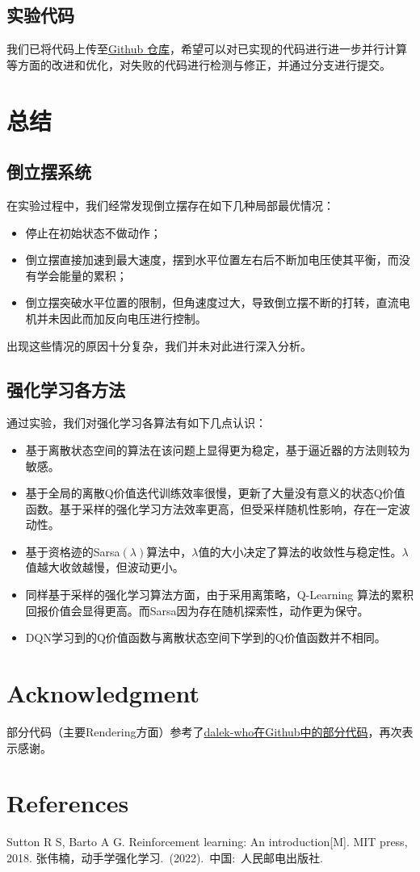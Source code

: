 \documentclass[conference,10pt]{IEEEtran}
\begin{document}
\subsection{实验代码}
我们已将代码上传至\href{https://github.com/Kingsley-Cheng/UCAS/tree/main/ReinforcementLearning/Homework1}{Github 仓库}，希望可以对已实现的代码进行进一步并行计算等方面的改进和优化，对失败的代码进行检测与修正，并通过分支进行提交。


\section{总结}
\subsection{倒立摆系统}
在实验过程中，我们经常发现倒立摆存在如下几种局部最优情况：
\begin{itemize}
\item 停止在初始状态不做动作；
\item 倒立摆直接加速到最大速度，摆到水平位置左右后不断加电压使其平衡，而没有学会能量的累积；
\item 倒立摆突破水平位置的限制，但角速度过大，导致倒立摆不断的打转，直流电机并未因此而加反向电压进行控制。
\end{itemize}
出现这些情况的原因十分复杂，我们并未对此进行深入分析。
\subsection{强化学习各方法}
通过实验，我们对强化学习各算法有如下几点认识：
\begin{itemize}
\item 基于离散状态空间的算法在该问题上显得更为稳定，基于逼近器的方法则较为敏感。
\item 基于全局的离散Q价值迭代训练效率很慢，更新了大量没有意义的状态Q价值函数。基于采样的强化学习方法效率更高，但受采样随机性影响，存在一定波动性。
\item 基于资格迹的Sarsa$(\lambda)$算法中，$\lambda$值的大小决定了算法的收敛性与稳定性。$\lambda$ 值越大收敛越慢，但波动更小。
\item 同样基于采样的强化学习算法方面，由于采用离策略，Q-Learning 算法的累积回报价值会显得更高。而Sarsa因为存在随机探索性，动作更为保守。
\item DQN学习到的Q价值函数与离散状态空间下学到的Q价值函数并不相同。
\end{itemize}
\section*{Acknowledgment}
部分代码（主要Rendering方面）参考了\href{https://github.com/dalek-who/Inverted-Pendulum}{dalek-who在Github中的部分代码}，再次表示感谢。

\section*{References}

\begin{thebibliography}{00}
 Sutton R S, Barto A G. Reinforcement learning: An introduction[M]. MIT press, 2018.
 张伟楠，动手学强化学习. (2022). 中国: 人民邮电出版社.
\end{thebibliography}
\end{document}

